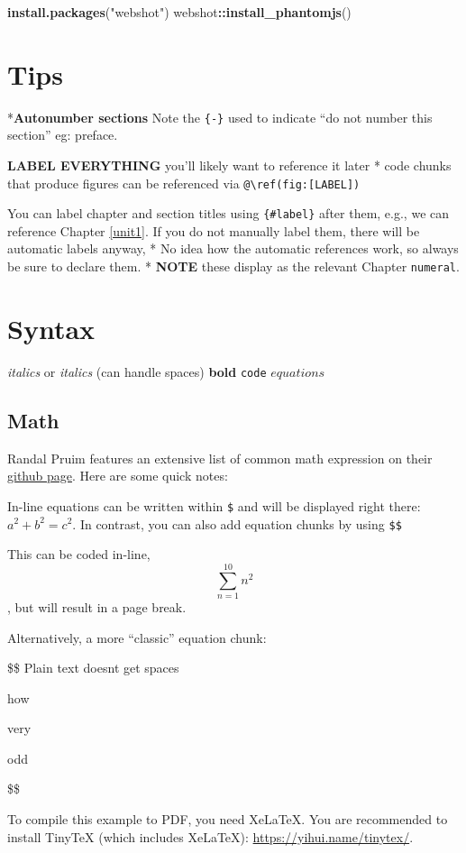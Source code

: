 \documentclass[
]{book}
\newenvironment{Shaded}{\begin{snugshade}}{\end{snugshade}}
\newcommand{\KeywordTok}[1]{\textcolor[rgb]{0.13,0.29,0.53}{\textbf{#1}}}
\newcommand{\NormalTok}[1]{#1}
\newcommand{\OperatorTok}[1]{\textcolor[rgb]{0.81,0.36,0.00}{\textbf{#1}}}
\newcommand{\StringTok}[1]{\textcolor[rgb]{0.31,0.60,0.02}{#1}}
\begin{document}
\begin{Shaded}
\begin{Highlighting}[]
\KeywordTok{install.packages}\NormalTok{(}\StringTok{"webshot"}\NormalTok{)}
\NormalTok{webshot}\OperatorTok{::}\KeywordTok{install_phantomjs}\NormalTok{()}
\end{Highlighting}
\end{Shaded}

\hypertarget{tips}{%
\section{Tips}\label{tips}}

*\textbf{Autonumber sections} Note the \texttt{\{-\}} used to indicate ``do not number this section'' eg: preface.

\textbf{LABEL EVERYTHING} you'll likely want to reference it later
* code chunks that produce figures can be referenced via \texttt{@\textbackslash{}ref(fig:{[}LABEL{]})}

You can label chapter and section titles using \texttt{\{\#label\}} after them, e.g., we can reference Chapter \ref{unit1}. If you do not manually label them, there will be automatic labels anyway,
* No idea how the automatic references work, so always be sure to declare them.
* \textbf{NOTE} these display as the relevant Chapter \texttt{numeral}.

\hypertarget{syntax}{%
\section{Syntax}\label{syntax}}

\emph{italics} or
\emph{italics} (can handle spaces)
\textbf{bold}
\texttt{code}
\(equations\)

\hypertarget{math}{%
\subsection{Math}\label{math}}

Randal Pruim features an extensive list of common math expression on their \href{https://rpruim.github.io/s341/S19/from-class/MathinRmd.html}{github page}. Here are some quick notes:

In-line equations can be written within \texttt{\$} and will be displayed right there: \(a^2 + b^2 = c^2\). In contrast, you can also add equation chunks by using \texttt{\$\$}

This can be coded in-line, \[\sum_{n=1}^{10} n^2\], but will result in a page break.

Alternatively, a more ``classic'' equation chunk:

\$\$
Plain text doesnt get spaces

how

very

odd

\$\$

To compile this example to PDF, you need XeLaTeX. You are recommended to install TinyTeX (which includes XeLaTeX): \url{https://yihui.name/tinytex/}.

  
\end{document}
